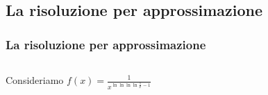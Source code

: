 \documentclass{beamer}
\begin{document}
	\subsection{La risoluzione per approssimazione}
	\begin{frame}
		\frametitle{La risoluzione per approssimazione}
		\begin{columns}
			\begin{column}{0.5\textwidth}
				Consideriamo \(
					f(x) = \frac{1}{x^{\ln{\ln{\ln{\ln{\frac{1}{x}}}}}-1}}
				\)
				
				\vspace{5mm}
				
				
				\vspace{5mm}
			
				\vspace{5mm}
			

\end{column}
\end{columns}
\end{frame}
\end{document}

